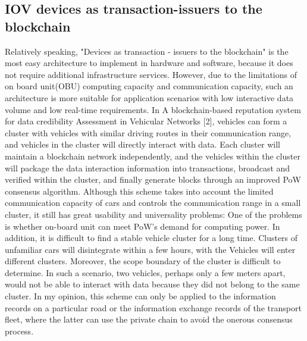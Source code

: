 \subsection{IOV devices as transaction-issuers to the blockchain}
Relatively speaking, "Devices as transaction - issuers to the blockchain" is the most easy architecture to implement in hardware and software, because it does not require additional infrastructure services. However, due to the limitations of on board unit(OBU)  computing capacity and communication capacity, such an architecture is more suitable for application scenarios with low interactive data volume and low real-time requirements.
 In A blockchain-based reputation system for data credibility Assessment in Vehicular Networks [2], vehicles can form a cluster with vehicles with similar driving routes in their communication range, and vehicles in the cluster will directly interact with data. Each cluster will maintain a blockchain network independently, and the vehicles within the cluster will package the data interaction information into transactions, broadcast and verified within the cluster, and finally generate blocks through an improved PoW consensus algorithm. Although this scheme takes into account the limited communication capacity of cars and controls the communication range in a small cluster, it still has great usability and universality problems: One of the problems is whether on-board unit can meet PoW's demand for computing power. In addition, it is difficult to find a stable vehicle cluster for a long time. Clusters of unfamiliar cars will disintegrate within a few hours, with the Vehicles will enter different clusters. Moreover, the scope boundary of the cluster is difficult to determine. In such a scenario, two vehicles, perhaps only a few meters apart, would not be able to interact with data because they did not belong to the same cluster.  In my opinion, this scheme can only be applied to the information records on a particular road or the information exchange records of the transport fleet, where the latter can use the private chain to avoid the onerous consensus process. 
